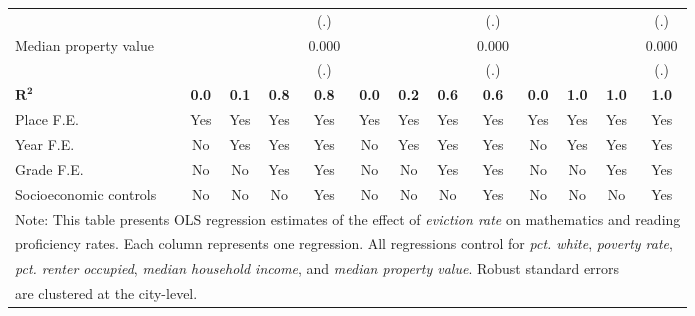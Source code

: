 \begin{table}[htbp]
\begin{tabular}{l*{12}{c}}
                    &            &            &            &         (.)&            &            &            &         (.)&            &            &            &         (.)\\
\hspace{0.25cm} Median property value&            &            &            &       0.000&            &            &            &       0.000&            &            &            &       0.000\\
                    &            &            &            &         (.)&            &            &            &         (.)&            &            &            &         (.)\\
\midrule
$\mathbf{R^2}$      &\textbf{0.0}&\textbf{0.1}&\textbf{0.8}&\textbf{0.8}&\textbf{0.0}&\textbf{0.2}&\textbf{0.6}&\textbf{0.6}&\textbf{0.0}&\textbf{1.0}&\textbf{1.0}&\textbf{1.0}\\
Place F.E.          &         Yes&         Yes&         Yes&         Yes&         Yes&         Yes&         Yes&         Yes&         Yes&         Yes&         Yes&         Yes\\
Year F.E.           &          No&         Yes&         Yes&         Yes&          No&         Yes&         Yes&         Yes&          No&         Yes&         Yes&         Yes\\
Grade F.E.          &          No&          No&         Yes&         Yes&          No&          No&         Yes&         Yes&          No&          No&         Yes&         Yes\\
Socioeconomic controls&          No&          No&          No&         Yes&          No&          No&          No&         Yes&          No&          No&          No&         Yes\\
\bottomrule
\multicolumn{13}{l}{\footnotesize Note: This table presents OLS regression estimates of the effect of \emph{eviction rate} on mathematics and reading}\\
\multicolumn{13}{l}{\footnotesize proficiency rates. Each column represents one regression. All regressions control for \emph{pct. white}, \emph{poverty rate},}\\
\multicolumn{13}{l}{\footnotesize \emph{pct. renter occupied}, \emph{median household income}, and \emph{median property value}. Robust standard errors}\\
\multicolumn{13}{l}{\footnotesize are clustered at the city-level.}\\
\end{tabular}
\end{table}
